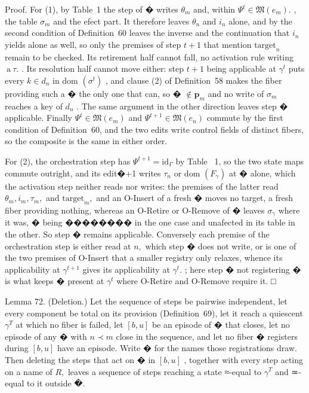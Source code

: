 \documentclass[
  10
]{article}
\begin{document}
Proof. For (1), by Table~1 the step of � writes \(\theta _ { m }\) and,
within \(\Psi ^ { t } \in \mathfrak { M } ( e _ { m } ) .\) , the table
\(\sigma _ { m }\) and the efect part. It therefore leaves
\(\theta _ { n }\) and \(i _ { n }\) alone, and by the second condition
of Definition~60 leaves the inverse and the continuation that
\(i _ { n }\) yields alone as well, so only the premises of step
\(t + 1\) that mention \(\mathrm { t a r g e t } _ { n }\) remain to be
checked. Its retirement half cannot fall, no activation rule writing
\(\mathrm { ~ a ~ } \tau .\) . Its resolution half cannot move either:
step \(t + 1\) being applicable at \(\gamma ^ { t }\) puts every
\(k \in d _ { n }\) in dom \(\scriptstyle ( \sigma ^ { t } )\) , and
clause (2) of Definition~58 makes the fiber providing such a � the only
one that can, so � \(\notin \boldsymbol { p } _ { m }\) and no write of
\(\sigma _ { m }\) reaches a key of \(d _ { n }\) . The same argument in
the other direction leaves step � applicable. Finally
\(\Psi ^ { t } \in \mathfrak { M } ( e _ { m } )\) and
\(\Psi ^ { t + 1 } \in \mathfrak { M } ( e _ { n } )\) commute by the
first condition of Definition~60, and the two edits write control fields
of distinct fibers, so the composite is the same in either order.

For (2), the orchestration step has
\(\Psi ^ { t + 1 } = \mathrm { i d } _ { \Gamma }\) by Table~ 1, so the
two state maps commute outright, and its edit�+1 writes \(\tau _ { n }\)
or dom \(\left( F _ { \gamma } \right)\) at � alone, which the
activation step neither reads nor writes: the premises of the latter
read \(\theta _ { m } , i _ { m } , \tau _ { m } ,\) and
\(\mathrm { t a r g e t } _ { m } ,\) and an O-Insert of a fresh � moves
no target, a fresh fiber providing nothing, whereas an O-Retire or
O-Remove of � leaves \(\sigma _ { \gamma }\) where it was, � being
�������� in the one case and unafected in its table in the other. So
step � remains applicable. Conversely each premise of the orchestration
step is either read at \(n ,\) which step � does not write, or is one of
the two premises of O-Insert that a smaller registry only relaxes,
whence its applicability at \(\gamma ^ { t + 1 }\) gives its
applicability at \(\gamma ^ { t } .\) ; here step � not registering � is
what keeps � present at \(\gamma ^ { t }\) where O-Retire and O-Remove
require it. □

Lemma 72. (Deletion.) Let the sequence of steps be pairwise independent,
let every component be total on its provision (Definition~69), let it
reach a quiescent \(\gamma ^ { T }\) at which no fiber is failed, let
\([ b , u ]\) be an episode of � that closes, let no episode of any �
with \(n \prec m\) close in the sequence, and let no fiber � registers
during \([ b , u ]\) have an episode. Write � for the names those
registrations draw. Then deleting the steps that act on � in
\([ b , u ]\) , together with every step acting on a name of \(R ,\)
leaves a sequence of steps reaching a state ≈-equal to
\(\gamma ^ { T }\) and ≃-equal to it outside �.
\end{document}
